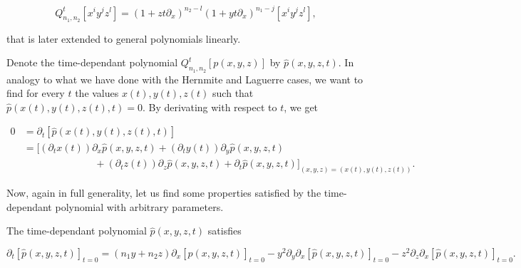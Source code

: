     \begin{equation*}
        Q_{n_1,n_2}^t [x^i y^j z^l] = (1+zt\partial_x)^{n_2-l} \left(1 + yt\partial_x\right)^{n_1 - j}[x^i y^j z^l],
    \end{equation*}

    \noindent that is later extended to general polynomials linearly. 

    Denote the time-dependant polynomial $Q_{n_1,n_2}^t[p(x,y,z)]$ by $\hat p(x,y,z,t)$. In analogy to what we have done with the Hernmite and Laguerre cases, we want to find for every $t$ the values $x(t), y(t), z(t)$ such that $\hat p(x(t),y(t),z(t),t)=0$. By derivating with respect to $t$, we get

    \begin{align*}
       0 &= \partial_t [\hat p(x(t),y(t),z(t),t)]\\ &= [(\partial_t x(t))\partial_x \hat p(x,y,z,t) + (\partial_t y(t))\partial_y  \hat p(x,y,z,t) \\
       &\phantom{espaciooooooooo}+ (\partial_t z(t))\partial_z \hat p(x,y,z,t) + \partial_t \hat p(x,y,z,t)]_{(x,y,z)=(x(t),y(t),z(t))}.
    \end{align*}

    Now, again in full generality, let us find some properties satisfied by the time-dependant polynomial with arbitrary parameters.

    \begin{lemma}
        The time-dependant polynomial $\hat p(x,y,z,t)$ satisfies

        \begin{equation} \label{eq:general_harmonic_roots}
            \partial_t[\hat p(x,y,z,t)]_{t=0} = (n_1y + n_2z)\partial_x[\hat p(x,y,z,t)]_{t=0} - y^2\partial_y\partial_x[\hat p(x,y,z,t)]_{t=0} - z^2\partial_z\partial_x[\hat p(x,y,z,t)]_{t=0}.
        \end{equation}
    \end{lemma}

